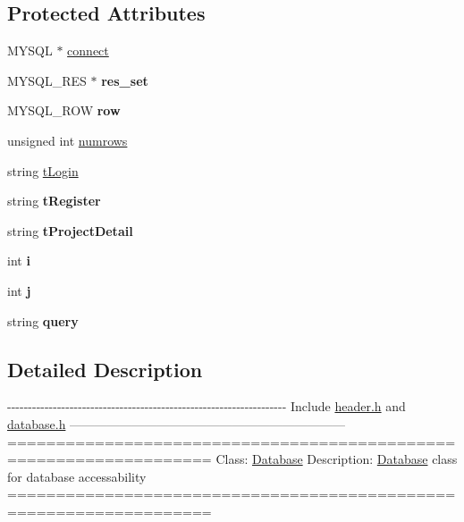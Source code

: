 \subsection*{Protected Attributes}
\begin{DoxyCompactItemize}
\item 
M\-Y\-S\-Q\-L $\ast$ \hyperlink{classDatabase_aa232b806b05ef654cd5579bca5f1dbad}{connect}
\item 
\hypertarget{classDatabase_ad5921cd2f70d0c22895f2cc5542ab4d7}{M\-Y\-S\-Q\-L\-\_\-\-R\-E\-S $\ast$ {\bfseries res\-\_\-set}}\label{classDatabase_ad5921cd2f70d0c22895f2cc5542ab4d7}

\item 
\hypertarget{classDatabase_a71ad7ae59677936d2ca6666f9de9df40}{M\-Y\-S\-Q\-L\-\_\-\-R\-O\-W {\bfseries row}}\label{classDatabase_a71ad7ae59677936d2ca6666f9de9df40}

\item 
unsigned int \hyperlink{classDatabase_a02965883689dd1d8007c86cebf6df89e}{numrows}
\item 
string \hyperlink{classDatabase_acd64ff0e98b28cd1c6928a1236634521}{t\-Login}
\item 
\hypertarget{classDatabase_aa8ec817b6216079c8e541ec80c8bd4fa}{string {\bfseries t\-Register}}\label{classDatabase_aa8ec817b6216079c8e541ec80c8bd4fa}

\item 
\hypertarget{classDatabase_a62dd3ad69a4a07e66b412e276049ea48}{string {\bfseries t\-Project\-Detail}}\label{classDatabase_a62dd3ad69a4a07e66b412e276049ea48}

\item 
\hypertarget{classDatabase_a1b3174ab4ae9b3cb80448d48817375be}{int {\bfseries i}}\label{classDatabase_a1b3174ab4ae9b3cb80448d48817375be}

\item 
\hypertarget{classDatabase_a5b4fd605238ca66878959f5f3ba647f2}{int {\bfseries j}}\label{classDatabase_a5b4fd605238ca66878959f5f3ba647f2}

\item 
\hypertarget{classDatabase_a851daa5b233ce54d75873631b7b2167a}{string {\bfseries query}}\label{classDatabase_a851daa5b233ce54d75873631b7b2167a}

\end{DoxyCompactItemize}


\subsection{Detailed Description}
-\/-\/-\/-\/-\/-\/-\/-\/-\/-\/-\/-\/-\/-\/-\/-\/-\/-\/-\/-\/-\/-\/-\/-\/-\/-\/-\/-\/-\/-\/-\/-\/-\/-\/-\/-\/-\/-\/-\/-\/-\/-\/-\/-\/-\/-\/-\/-\/-\/-\/-\/-\/-\/-\/-\/-\/-\/-\/-\/-\/-\/-\/-\/-\/-\/-\/-\/ Include \hyperlink{header_8h_source}{header.\-h} and \hyperlink{database_8h_source}{database.\-h} ------------------------------------------------------------------ =================================================================== Class\-: \hyperlink{classDatabase}{Database} Description\-: \hyperlink{classDatabase}{Database} class for database accessability =================================================================== 

